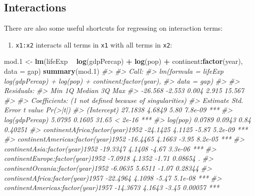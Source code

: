 \documentclass[
]{book}
\newenvironment{Shaded}{\begin{snugshade}}{\end{snugshade}}
\newcommand{\CommentTok}[1]{\textcolor[rgb]{0.56,0.35,0.01}{\textit{#1}}}
\newcommand{\DataTypeTok}[1]{\textcolor[rgb]{0.13,0.29,0.53}{#1}}
\newcommand{\FloatTok}[1]{\textcolor[rgb]{0.00,0.00,0.81}{#1}}
\newcommand{\KeywordTok}[1]{\textcolor[rgb]{0.13,0.29,0.53}{\textbf{#1}}}
\newcommand{\NormalTok}[1]{#1}
\newcommand{\OperatorTok}[1]{\textcolor[rgb]{0.81,0.36,0.00}{\textbf{#1}}}
\newcommand{\StringTok}[1]{\textcolor[rgb]{0.31,0.60,0.02}{#1}}
\providecommand{\tightlist}{%
  \setlength{\itemsep}{0pt}\setlength{\parskip}{0pt}}
\begin{document}
\hypertarget{interactions}{%
\subsection{Interactions}\label{interactions}}

There are also some useful shortcuts for regressing on interaction terms:

\begin{enumerate}
\def\labelenumi{\arabic{enumi}.}
\tightlist
\item
  \texttt{x1:x2} interacts all terms in \texttt{x1} with all terms in \texttt{x2}:
\end{enumerate}

\begin{Shaded}
\begin{Highlighting}[]
\NormalTok{mod}\FloatTok{.1}\NormalTok{ <-}\StringTok{ }\KeywordTok{lm}\NormalTok{(lifeExp }\OperatorTok{~}\StringTok{ }\KeywordTok{log}\NormalTok{(gdpPercap) }\OperatorTok{+}\StringTok{ }\KeywordTok{log}\NormalTok{(pop) }\OperatorTok{+}\StringTok{ }\NormalTok{continent}\OperatorTok{:}\KeywordTok{factor}\NormalTok{(year), }\DataTypeTok{data =}\NormalTok{ gap)}
\KeywordTok{summary}\NormalTok{(mod}\FloatTok{.1}\NormalTok{)}
\CommentTok{#> }
\CommentTok{#> Call:}
\CommentTok{#> lm(formula = lifeExp ~ log(gdpPercap) + log(pop) + continent:factor(year), }
\CommentTok{#>     data = gap)}
\CommentTok{#> }
\CommentTok{#> Residuals:}
\CommentTok{#>     Min      1Q  Median      3Q     Max }
\CommentTok{#> -26.568  -2.553   0.004   2.915  15.567 }
\CommentTok{#> }
\CommentTok{#> Coefficients: (1 not defined because of singularities)}
\CommentTok{#>                                    Estimate Std. Error t value Pr(>|t|)    }
\CommentTok{#> (Intercept)                         27.1838     4.6849    5.80  7.8e-09 ***}
\CommentTok{#> log(gdpPercap)                       5.0795     0.1605   31.65  < 2e-16 ***}
\CommentTok{#> log(pop)                             0.0789     0.0943    0.84  0.40251    }
\CommentTok{#> continentAfrica:factor(year)1952   -24.1425     4.1125   -5.87  5.2e-09 ***}
\CommentTok{#> continentAmericas:factor(year)1952 -16.4465     4.1663   -3.95  8.2e-05 ***}
\CommentTok{#> continentAsia:factor(year)1952     -19.3347     4.1408   -4.67  3.3e-06 ***}
\CommentTok{#> continentEurope:factor(year)1952    -7.0918     4.1352   -1.71  0.08654 .  }
\CommentTok{#> continentOceania:factor(year)1952   -6.0635     5.6511   -1.07  0.28344    }
\CommentTok{#> continentAfrica:factor(year)1957   -22.4964     4.1098   -5.47  5.1e-08 ***}
\CommentTok{#> continentAmericas:factor(year)1957 -14.3673     4.1643   -3.45  0.00057 ***}

\end{Highlighting}
\end{Shaded}
\end{document}
